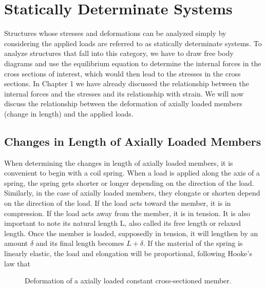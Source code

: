 \documentclass[
10pt,
a4paper,
openany,
svgnames,
]{book} %
\begin{document}
\section{Statically Determinate Systems}

Structures whose stresses and deformations can be analyzed simply by considering the applied loads are referred to as statically determinate systems. To analyze structures that fall into this category, we have to draw free body diagrams and use the equilibrium equation to determine the internal forces in the cross sections of interest, which would then lead to the stresses in the cross sections. In Chapter 1 we have already discussed the relationship between the internal forces and the stresses and its relationship with strain. We will now discuss the relationship between the deformation of axially loaded members (change in length) and the applied loads.

\subsection{Changes in Length of Axially Loaded Members}

When determining the changes in length of axially loaded members, it is convenient to begin with a coil spring. When a load is applied along the axis of a spring, the spring gets shorter or longer depending on the direction of the load.
Similarly, in the case of axially loaded members, they elongate or shorten depend on the direction of the load. If the load acts toward the member, it is in compression. If the load acts away from the member, it is in tension. It is also important to note its natural length L, also called its free length or relaxed length. Once the member is loaded, supposedly in tension, it will lengthen by an amount $\delta$ and its final length becomes $L + \delta$. If the material of the spring is linearly elastic, the load and elongation will be proportional, following Hooke’s law that

\begin{figure}[h]
  \centering
  \caption{Deformation of a axially loaded constant cross-sectioned member.}
\end{figure}
\end{document}

